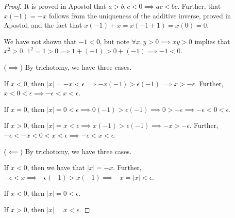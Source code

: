 \documentclass[12pt,letterpaper]{article}
\theoremstyle{definition}
\begin{document}
\begin{proof}
    It is proved in Apostol that $a > b, c < 0 \implies ac < bc$.
    Further, that $x(-1) = -x$ follows from the uniqueness of the additive inverse,
    proved in Apostol, and the fact that $x(-1) + x = x(-1 + 1) = x(0) = 0$.

    We have not shown that $-1 < 0$, but note $\forall x,y > 0 \implies xy > 0$ implies that
    $x^2 > 0$. $1^2 = 1 > 0 \implies 1 + (-1) > 0 + (-1) \implies -1 < 0$.

    ($\implies$) By trichotomy, we have three cases.
    
    If $x < 0$, then $|x| = -x < \epsilon \implies -x(-1) > \epsilon(-1) \implies x > -\epsilon$.
    Further, $x < 0 < \epsilon \implies -\epsilon < x < \epsilon$.

    If $x = 0$, then $|x| = 0 < \epsilon \implies 0(-1) > \epsilon(-1) \implies 0 > -\epsilon \implies -\epsilon < 0 < \epsilon$.

    If $x > 0$, then $|x| = x < \epsilon \implies x(-1) > \epsilon(-1) \implies -x > -\epsilon$.
    Further, $ -\epsilon < -x < 0 < x < \epsilon \implies -\epsilon < x < \epsilon$.

    ($\impliedby$) By trichotomy, we have three cases.

    If $x < 0$, then we have that $|x| = -x$. 
    Further, $-\epsilon < x \implies -\epsilon(-1) > x(-1) \implies -x = |x| < \epsilon$.

    If $x < 0$, then $|x| = 0 < \epsilon$.

    If $x > 0$, then $|x| = x < \epsilon$.
\end{proof}
\end{document}
